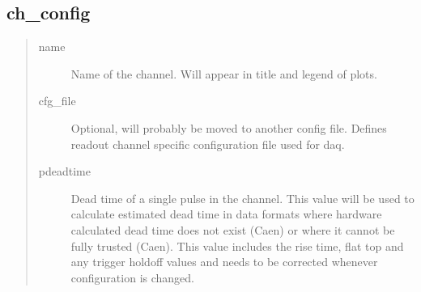 \documentclass[letterpaper,10pt,english]{sphinxmanual}
\begin{document}
\subsection{ch\_config}
\label{\detokenize{manual/configuration:ch-config}}\begin{quote}\begin{description}
\item[{name}] \leavevmode
\sphinxAtStartPar
Name of the channel. Will appear in title and legend of plots.

\item[{cfg\_file}] \leavevmode
\sphinxAtStartPar
Optional, will probably be moved to another config file. Defines readout channel
specific configuration file used for daq.

\item[{pdeadtime}] \leavevmode
\sphinxAtStartPar
Dead time of a single pulse in the channel. This value will be used to calculate
estimated dead time in data formats where hardware calculated dead time does not
exist (Caen) or where it cannot be fully trusted (Caen). This value includes the
rise time, flat top and any trigger holdoff values and needs to be corrected whenever
configuration is changed.

\end{description}\end{quote}
\end{document}
